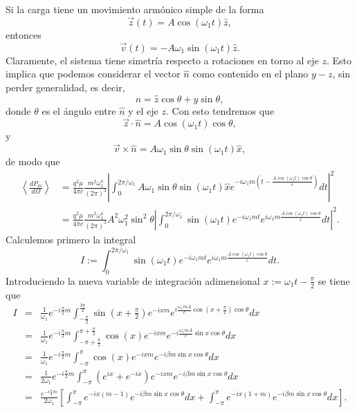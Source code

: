 Si la carga tiene un movimiento armónico simple de la forma
\begin{equation}
\vec{z}(t) =A\cos(\omega_1t)\hat{z},
\end{equation}
entonces
\begin{equation}
\vec{v}(t) =-A\omega_1\sin(\omega_1t)\hat{z}.
\end{equation}
Claramente, el sistema tiene simetría respecto a rotaciones en torno al eje
$z$. Esto implica que podemos considerar el vector $\hat{n}$ como contenido en
el plano $y-z$, sin perder generalidad, es decir,
\begin{equation}
\hat{n}=\hat{z}\cos\theta+\hat{y}\sin\theta,
\end{equation}
donde $\theta$ es el ángulo entre $\hat{n}$ y el eje $z$. Con esto tendremos
que
\begin{equation}
 \vec{z}\cdot\hat{n}=A\cos(\omega_1t)\cos\theta ,
\end{equation}
y
\begin{equation}
\vec{v}\times\hat{n}=A\omega_1\sin\theta\sin(\omega_1t)  \hat{x},
\end{equation}
de modo que
\begin{align}
\left\langle \frac{dP_{m}}{d\Omega}\right\rangle &=
\frac{q^2\mu}{4\pi c}\frac{m^2\omega_1^4}{\left(2\pi\right)^3}
\left| \int_0^{2\pi/\omega_1}A\omega_1\sin\theta\sin\left(\omega_1t\right)
\hat{x}e^{-i\omega_1m\left(t-\frac{A\cos\left(\omega_1t\right)\cos\theta}{c}\right)}dt\right|^2\\
&=\frac{q^2\mu}{4\pi c}\frac{m^2\omega_1^4}{\left(2\pi\right)^3}
A^2\omega_1^2\sin^2\theta\left| \int_0^{2\pi/\omega_1}\sin\left(
\omega_1t\right) e^{-i\omega_1mt}e^{i\omega_1m\frac{A\cos\left(
\omega_1t\right)  \cos\theta}{c}}dt\right|^2 .  \label{promedioantescvar}
\end{align}
Calculemos primero la integral
\begin{equation}
I:=\int_0^{2\pi/\omega_1}\sin\left(\omega_1t\right)
e^{-i\omega_1mt}e^{i\omega_1m\frac{A\cos\left(  \omega_1t\right)
\cos\theta}{c}}dt.
\end{equation}
Introduciendo la nueva variable de integración adimensional
$x:=\omega_1t-\frac{\pi}{2}$ se tiene que
\begin{eqnarray}
I&=&\frac{1}{\omega_1}e^{-i\frac{\pi}{2}m}\int_{-\frac{\pi}{2}}^{\frac{3\pi}{2}}
\sin\left(x+\frac{\pi}{2}\right)  e^{-ixm}e^{i\frac{\omega_1mA}{c}\cos\left(
x+\frac{\pi}{2}\right)  \cos\theta}dx \\
&=&\frac{1}{\omega_1}e^{-i\frac{\pi}{2}m}\int_{-\pi+\frac{\pi}{2}}^{\pi+\frac{\pi
}{2}}\cos(x)e^{-ixm}e^{-i\frac{\omega_1mA}{c}\sin x\cos\theta}dx\\
&=&\frac{1}{\omega_1}e^{-i\frac{\pi}{2}m}\int_{-\pi}^{\pi}\cos(x)
e^{-ixm}e^{-i\beta m\sin x\cos\theta}dx\\
&=&\frac{1}{2\omega_1}e^{-i\frac{\pi}{2}m}\int_{-\pi}^{\pi}\left(
e^{ix}+e^{-ix}\right)e^{-ixm}e^{-i\beta m\sin x\cos\theta}dx\\
&=&\frac{e^{-i\frac{\pi}{2}m}}{2\omega_1}\left[\int_{-\pi}^{\pi}e^{-ix\left(
m-1\right)}e^{-i\beta m\sin x\cos\theta}dx+\int_{-\pi}^{\pi}e^{-ix\left(
1+m\right)}e^{-i\beta m\sin x\cos\theta}dx\right]  .
\end{eqnarray}
